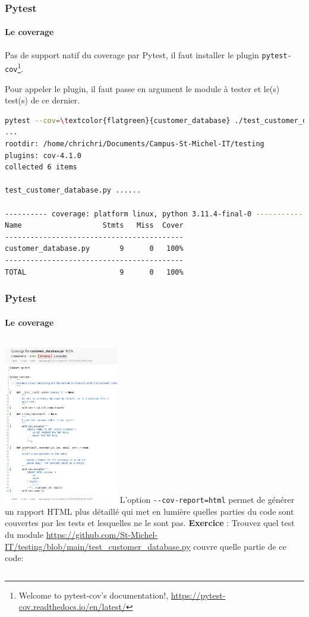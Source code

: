 \documentclass{beamer}
\begin{document}
    \begin{frame}[fragile]
        \frametitle{Pytest}
        \framesubtitle{Le coverage}
        \transdissolve
        Pas de support natif du coverage par Pytest, il faut installer le plugin \lstinline{pytest-cov}\footnote{Welcome to pytest-cov’s documentation!, \url{https://pytest-cov.readthedocs.io/en/latest/}}.

        Pour appeler le plugin, il faut passe en argument le module à tester et le(s) test(s) de ce dernier.


        \begin{lstlisting}[language=sh]
pytest --cov=\textcolor{flatgreen}{customer_database} ./test_customer_database.py
...
rootdir: /home/chrichri/Documents/Campus-St-Michel-IT/testing
plugins: cov-4.1.0
collected 6 items

test_customer_database.py ......                                                                                                                                                                                                 [100%]

---------- coverage: platform linux, python 3.11.4-final-0 -----------
Name                   Stmts   Miss  Cover
------------------------------------------
customer_database.py       9      0   100%
------------------------------------------
TOTAL                      9      0   100%
        \end{lstlisting}

    \end{frame}

    \begin{frame}
        \frametitle{Pytest}
        \framesubtitle{Le coverage}
        \transdissolve
        \begin{columns}

            \centering
            \includegraphics[width=5cm]{image/html-coverage.png}
            L'option \lstinline{--cov-report=html} permet de générer un rapport HTML plus détaillé qui met en lumière quelles parties du code sont couvertes par les tests et lesquelles ne le sont pas.
            \bigbreak
            \textbf{Exercice} : Trouvez quel test du module \url{https://github.com/St-Michel-IT/testing/blob/main/test_customer_database.py} couvre quelle partie de ce code:
        \end{columns}

    \end{frame}
\end{document}
